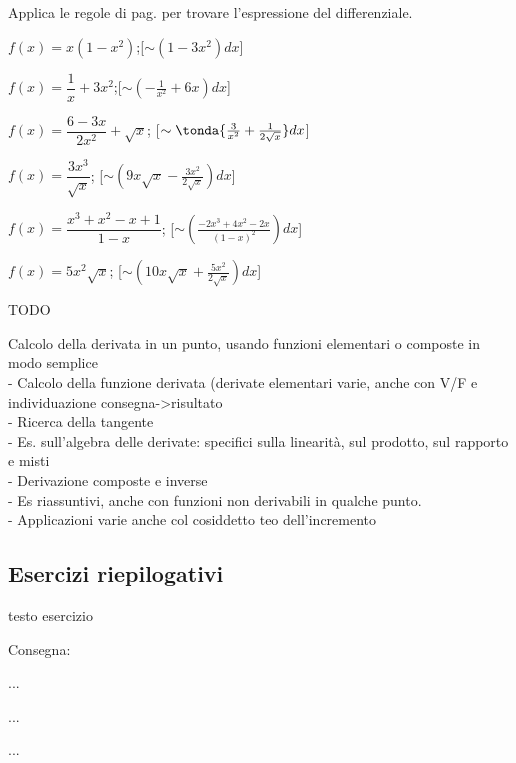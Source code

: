 \begin{esercizio}\label{ese:dif07}
Applica le regole di pag.\pageref{subsubsec:diff01_diffsint} per trovare 
l'espressione del differenziale.
 \begin{enumeratea}
  \item $f(x)=x(1-x^2)$;\hfill [$\sim (1-3x^2)dx$]
  \item $f(x)=\dfrac{1}{x}+ 3x^2$;\hfill [$\sim (-\frac{1}{x^2}+6x)dx$]
  \item $f(x)=\dfrac{6-3x}{2x^2}+\sqrt{x}$;\hfill 
  [$\sim \tonda{\frac{3}{x^2}+\frac{1}{2\sqrt{x}}}dx$]
  \item $f(x)=\dfrac{3x^3}{\sqrt{x}}$;\hfill 
  [$\sim (9x\sqrt{x}-\frac{3x^2}{2\sqrt{x}})dx$]
  \item $f(x)=\dfrac{x^3+x^2-x+1}{1-x}$;\hfill 
  [$\sim (\frac{-2x^3+4x^2-2x}{(1-x)^2})dx$]
  \item $f(x)=5x^2\sqrt{x}$;\hfill 
  [$\sim (10x\sqrt{x}+\frac{5x^2}{2\sqrt{x}})dx$]
 \end{enumeratea}
\end{esercizio} 

TODO

Calcolo della derivata in un punto, usando funzioni elementari 
 o composte in modo semplice\\
- Calcolo della funzione derivata (derivate elementari varie, anche
con V/F e individuazione consegna->risultato\\
- Ricerca della tangente\\
- Es. sull'algebra delle derivate: specifici sulla linearità,
sul prodotto, sul rapporto e misti\\
- Derivazione composte e inverse\\
- Es riassuntivi, anche con funzioni non derivabili in qualche punto.\\
- Applicazioni varie anche col cosiddetto teo dell'incremento \\

\subsection{Esercizi riepilogativi}

\begin{esercizio}
\label{ese:D.19}
testo esercizio
\end{esercizio}

\begin{esercizio}\label{ese:03.1}
Consegna:
 \begin{enumeratea}
  \item  ...
  \item ...
  \item ...
 \end{enumeratea}
\end{esercizio}

